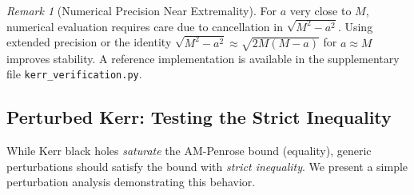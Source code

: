 \documentclass[12pt]{article}
\theoremstyle{plain}
\theoremstyle{definition}
\theoremstyle{remark}
\newtheorem{remark}[theorem]{Remark}
\begin{document}
\begin{remark}[Numerical Precision Near Extremality]
For $a$ very close to $M$, numerical evaluation requires care due to cancellation in $\sqrt{M^2 - a^2}$. Using extended precision or the identity $\sqrt{M^2 - a^2} \approx \sqrt{2M(M-a)}$ for $a \approx M$ improves stability. A reference implementation is available in the supplementary file \texttt{kerr\_verification.py}.
\end{remark}

\subsection{Perturbed Kerr: Testing the Strict Inequality}

While Kerr black holes \emph{saturate} the AM-Penrose bound (equality), generic perturbations should satisfy the bound with \emph{strict inequality}. We present a simple perturbation analysis demonstrating this behavior.
\end{document}
